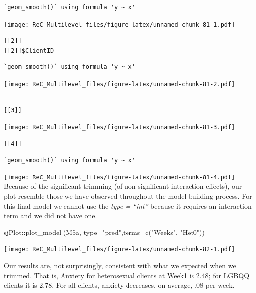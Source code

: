 \documentclass[
  11pt,
]{book}
\newenvironment{Shaded}{\begin{snugshade}}{\end{snugshade}}
\newcommand{\AttributeTok}[1]{\textcolor[rgb]{0.77,0.63,0.00}{#1}}
\newcommand{\FunctionTok}[1]{\textcolor[rgb]{0.00,0.00,0.00}{#1}}
\newcommand{\NormalTok}[1]{#1}
\newcommand{\SpecialCharTok}[1]{\textcolor[rgb]{0.00,0.00,0.00}{#1}}
\newcommand{\StringTok}[1]{\textcolor[rgb]{0.31,0.60,0.02}{#1}}
\begin{document}
\begin{verbatim}
`geom_smooth()` using formula 'y ~ x'
\end{verbatim}

\texttt{[image: ReC\_Multilevel\_files/figure-latex/unnamed-chunk-81-1.pdf]}

\begin{verbatim}
[[2]]
[[2]]$ClientID
\end{verbatim}

\begin{verbatim}
`geom_smooth()` using formula 'y ~ x'
\end{verbatim}

\texttt{[image: ReC\_Multilevel\_files/figure-latex/unnamed-chunk-81-2.pdf]}

\begin{verbatim}

[[3]]
\end{verbatim}

\texttt{[image: ReC\_Multilevel\_files/figure-latex/unnamed-chunk-81-3.pdf]}

\begin{verbatim}
[[4]]
\end{verbatim}

\begin{verbatim}
`geom_smooth()` using formula 'y ~ x'
\end{verbatim}

\texttt{[image: ReC\_Multilevel\_files/figure-latex/unnamed-chunk-81-4.pdf]}
Because of the significant trimming (of non-significant interaction effects), our plot resemble those we have observed throughout the model building process. For this final model we cannot use the \emph{type = ``int''} because it requires an interaction term and we did not have one.

\begin{Shaded}
\begin{Highlighting}[]
\NormalTok{sjPlot}\SpecialCharTok{::}\FunctionTok{plot\_model}\NormalTok{ (M5a, }\AttributeTok{type=}\StringTok{"pred"}\NormalTok{,}\AttributeTok{terms=}\FunctionTok{c}\NormalTok{(}\StringTok{"Weeks"}\NormalTok{, }\StringTok{"Het0"}\NormalTok{))}
\end{Highlighting}
\end{Shaded}

\texttt{[image: ReC\_Multilevel\_files/figure-latex/unnamed-chunk-82-1.pdf]}

Our results are, not surprisingly, consistent with what we expected when we trimmed. That is, Anxiety for heterosexual clients at Week1 is 2.48; for LGBQQ clients it is 2.78. For all clients, anxiety decreases, on average, .08 per week.
\end{document}
